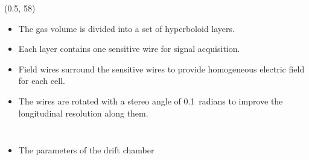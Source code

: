 \documentclass[final,xcolor={dvipsnames,svgnames,x11names,table}]{beamer}
\begin{document}
\begin{frame}
\begin{textblock}{83}
\begin{tcolorbox}[title=The IDEA detector concept for FCC-ee]
\begin{columns}
  \end{columns}


  \end{tcolorbox}
\end{textblock}

\begin{textblock}{43}(0.5, 58)
  \begin{tcolorbox}[title=The drift chamber]

    \begin{itemize}
      \item The gas volume is divided into a set of hyperboloid layers.
      \item Each layer contains one sensitive wire for signal acquisition.
      \item Field wires surround the sensitive wires to provide homogeneous electric field for each cell.
      \item The wires are rotated with a stereo angle of 0.1~radians to improve the longitudinal resolution along them.
    \end{itemize}

    \begin{columns}
      \begin{itemize}
        \item The parameters of the drift chamber
      \end{itemize}


\end{columns}
\end{tcolorbox}
\end{textblock}
\end{frame}
\end{document}
